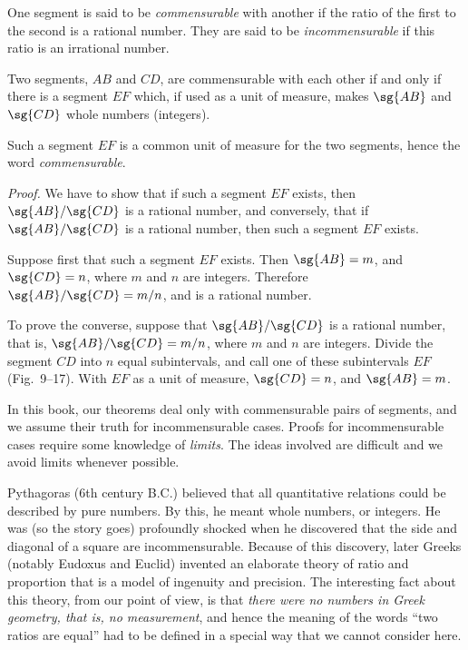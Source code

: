 \documentclass[11pt]{book}
\theoremstyle{bkplain}
\theoremstyle{XIplainnote}
\theoremstyle{bkplain}
\theoremstyle{bkplain}
\begin{document}
\begin{definition}
One segment is said to be \emph{commensurable} with another if the ratio of the
first to the second is a rational number. They are said to be
\emph{incommensurable} if this ratio is an irrational number.
\end{definition}

\begin{theorem}
Two segments, $AB$ and $CD$, are commensurable with each other if and only if
there is a segment $EF$ which, if used as a unit of measure, makes $\sg{AB}$ and
$\sg{CD}$ whole numbers (integers).
\end{theorem}

\begin{remark}
Such a segment $EF$ is a common unit of measure for the two segments, hence the
word \emph{commensurable}.
\end{remark}

\noindent\emph{Proof.} We have to show that if such a segment $EF$ exists, then
$\sg{AB}/\sg{CD}$ is a rational number, and conversely, that if
$\sg{AB}/\sg{CD}$ is a rational number, then such a segment $EF$ exists.

Suppose first that such a segment $EF$ exists. Then $\sg{AB} = m$, and
$\sg{CD} = n$, where $m$ and $n$ are integers. Therefore $\sg{AB}/\sg{CD} = m/n$,
and is a rational number.

To prove the converse, suppose that $\sg{AB}/\sg{CD}$ is a rational number, that
is, $\sg{AB}/\sg{CD} = m/n$, where $m$ and $n$ are integers. Divide the segment
$CD$ into $n$ equal subintervals, and call one of these subintervals $EF$
(Fig.~9--17). With $EF$ as a unit of measure, $\sg{CD} = n$, and $\sg{AB} = m$.

\FIGIXSEVENTEEN

\begin{note}
In this book, our theorems deal only with commensurable pairs of segments, and we
assume their truth for incommensurable cases. Proofs for incommensurable cases
require some knowledge of \emph{limits}. The ideas involved are difficult and we
avoid limits whenever possible.
\end{note}

\begin{histremark}
Pythagoras (6th century B.C.) believed that all quantitative relations could be
described by pure numbers. By this, he meant whole numbers, or integers. He was
(so the story goes) profoundly shocked when he discovered that the side and
diagonal of a square are incommensurable. Because of this discovery, later Greeks
(notably Eudoxus and Euclid) invented an elaborate theory of ratio and
proportion that is a model of ingenuity and precision. The interesting fact
about this theory, from our point of view, is
that \emph{there were no numbers in Greek geometry, that is, no measurement}, and
hence the meaning of the words ``two ratios are equal'' had to be defined in a
special way that we cannot consider here.
\end{histremark}
\end{document}
